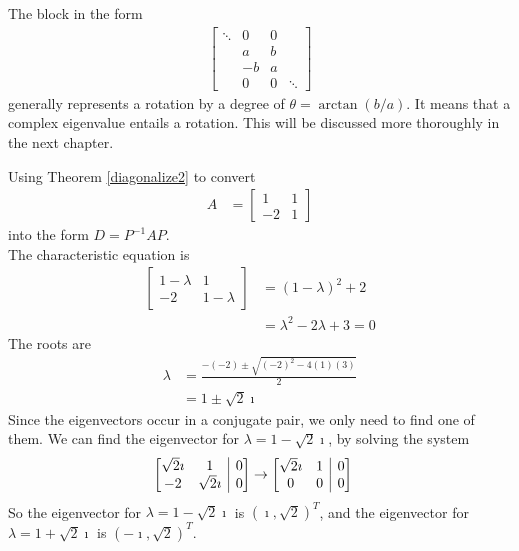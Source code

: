 The block in the form
\begin{align*}
\begin{bmatrix}
\ddots & 0 & 0 & \\
& a & b & \\
& -b & a & \\
& 0 & 0 & \ddots
\end{bmatrix}    
\end{align*}
generally represents a rotation by a degree of $\theta = \arctan(b/a)$. It means that a complex eigenvalue entails a rotation. This will be discussed more thoroughly in the next chapter.

\begin{exmp}
\label{ex8.2.2}
Using Theorem \ref{diagonalize2} to convert
\begin{align*}
A &= 
\begin{bmatrix}
1 & 1 \\
-2 & 1
\end{bmatrix}
\end{align*}
into the form $D = P^{-1}AP$.\\
The characteristic equation is
\begin{align*}
\begin{bmatrix}
1-\lambda & 1 \\
-2 & 1-\lambda
\end{bmatrix} 
&=
(1-\lambda)^2 + 2 \\
&= \lambda^2 - 2\lambda + 3 = 0
\end{align*}
The roots are
\begin{align*}
\lambda &= \frac{-(-2) \pm \sqrt{(-2)^2 - 4(1)(3)}}{2} \\
&= 1 \pm \sqrt{2}\imath
\end{align*}
Since the eigenvectors occur in a conjugate pair, we only need to find one of them. We can find the eigenvector for $\lambda = 1 - \sqrt{2}\imath$, by solving the system
\begin{align*}
\left[\begin{array}{@{}cc|c@{}}
\sqrt{2}\imath & 1 & 0 \\
-2 & \sqrt{2}\imath & 0
\end{array}\right] &\to  
\left[\begin{array}{@{}cc|c@{}}
\sqrt{2}\imath & 1 & 0 \\
0 & 0 & 0
\end{array}\right]
\end{align*}
So the eigenvector for $\lambda = 1 - \sqrt{2}\imath$ is $(\imath, \sqrt{2})^T$, and the eigenvector for $\lambda = 1 + \sqrt{2}\imath$ is $(-\imath, \sqrt{2})^T$.

\end{exmp}
